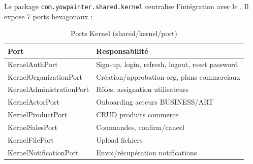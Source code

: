 Le package \texttt{com.yowpainter.shared.kernel} centralise l'intégration avec le
. Il expose 7 ports hexagonaux :

\begin{table}[h]
  \centering
  \caption{Ports Kernel (shared/kernel/port)}
  \label{tab:kernel-ports}
  \begin{tabular}{@{}ll@{}}
    \toprule
    \textbf{Port} & \textbf{Responsabilité} \\
    \midrule
    KernelAuthPort            & Sign-up, login, refresh, logout, reset password \\
    KernelOrganizationPort      & Création/approbation org, plans commerciaux \\
    KernelAdministrationPort  & Rôles, assignation utilisateurs \\
    KernelActorPort             & Onboarding acteurs BUSINESS/ART \\
    KernelProductPort           & CRUD produits commerce \\
    KernelSalesPort             & Commandes, confirm/cancel \\
    KernelFilePort              & Upload fichiers \\
    KernelNotificationPort      & Envoi/récupération notifications \\
    \bottomrule
  \end{tabular}
\end{table}
